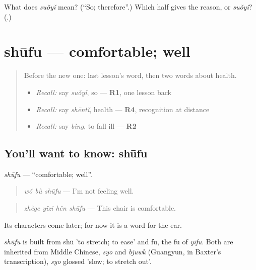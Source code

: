 \begin{tcolorbox}[breakable,colback=teal!4,colframe=teal!35!black,title={Before you move on}]
What does \emph{suǒyǐ} mean? (\textquotedblleft{}So; therefore\textquotedblright{}.) Which half gives the reason,  or \emph{suǒyǐ}? (\textbf{}.)
\end{tcolorbox}
\section[shūfu]{shūfu — comfortable; well}

\label{lesson:ZH-C96-shufu}



\begin{quote}
Before the new one: last lesson's word, then two words about health.

\begin{itemize}
\raggedright
  \item \emph{Recall:} say \emph{suǒyǐ}, so — \textbf{R1}, one lesson back
  \item \emph{Recall:} say \emph{shēntǐ}, health — \textbf{R4}, recognition at distance
  \item \emph{Recall:} say \emph{bìng}, to fall ill — \textbf{R2}
\end{itemize}
\end{quote}

\subsection*{You'll want to know: shūfu}
\emph{shūfu} — \textquotedblleft{}comfortable; well\textquotedblright{}.

\begin{quote}
\emph{wǒ bù shūfu} — I'm not feeling well.
\end{quote}

\begin{quote}
\emph{zhège yǐzi hěn shūfu} — This chair is comfortable.
\end{quote}

Its characters come later; for now it is a word for the ear.

\begin{cousinweb}
\emph{shūfu} is built from shū 'to stretch; to ease' and fu, the fu of \emph{yīfu}. Both are inherited from Middle Chinese, \emph{syo} and \emph{bjuwk} (Guangyun, in Baxter's transcription), \emph{syo} glossed 'slow; to stretch out'.
\end{cousinweb}

